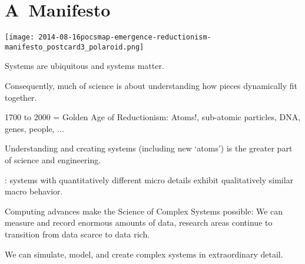 \section{A\ Manifesto}
  \texttt{[image: 2014-08-16pocsmap-emergence-reductionism-manifesto\_postcard3\_polaroid.png]}
  \small


  \textbf{}
      Systems are ubiquitous and systems matter.
    
      Consequently, much of science is about understanding
      how pieces dynamically fit together.
    
      1700 to 2000 = Golden Age of Reductionism:\newline
      Atoms!, sub-atomic particles, DNA, genes, people, ...
    
      Understanding and creating systems (including new `atoms')
      is the greater part of science and engineering.
    
      : systems with quantitatively different micro details
      exhibit qualitatively similar macro behavior.
    
      Computing advances make the Science of Complex Systems possible:
        We can measure and record enormous amounts of data,
        research areas continue to transition from data scarce to data rich.
      
        We can simulate, model, and create complex systems
        in extraordinary detail.  
  
